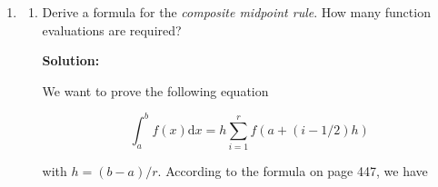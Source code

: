 \documentclass[12pt]{article}
\newcommand{\abs}[1]{\left| #1 \right|}
\begin{document}
\begin{enumerate}
\begin{enumerate}
\begin{align*}
E(f) = \frac{f^{(4)}(\eta)}{4!} \cdot \frac{4(b-a)^{5}}{5!} = \frac{f^{(4)}(\eta)(a - b)^{5}}{720}
\end{align*}

\item Use the basic corrected trapezoidal rule to evaluate approximations for $\int_{0}^{1}e^{x}\text{d}x$ and $\int_{0.9}^{1}e^{x}\text{d}x$. Compare errors to those of Example 15.2. What are your observations?

{\bf Solution:}

\begin{align*}
I_{f} &= \frac{b-a}{2}(f(a) + f(b)) + \frac{(b-a)^{2}}{12}(f^{\prime}(a) - f^{\prime}(b))
\intertext{For $a=0$ and $b=1$}
I_{f} &= \frac{1}{2}(1 + e) + \frac{1}{12}(1-e) = 1.7160\\
\intertext{For $a = 0.9$ and $b = 1$}
I_{f} &= \frac{1}{2}\left( e^{0.9} + e\right) + \frac{1}{12}\left( e^{0.9} - e\right) = 2.5674
\intertext{According to Example 15.2, the actual value is given, so we can find the error by the corrected trapezoidal rule, for $a = 0$ and $b = 1$}
E(f) &= \abs{1.7183 - 1.7160} = 0.0023\\
\intertext{for $a = 0.9$ and $b = 1$}
E(f) &= \abs{1.7183 - 2.5674} = 0.8491
\end{align*}

In $[0,1]$, the corrected trapezoidal rule is more accurate than the regular trapezoidal rule and the midpoint rule, though it still underperforms when compared to Simpson's rule ($\xi = 0.0006$). However, in $[0.9, 1]$ all of the methods are more accurate than the corrected trapezoidal rule.

\end{enumerate}

\item 

\begin{enumerate}
\item Derive a formula for the {\em composite midpoint rule}. How many function evaluations are required?

{\bf Solution:}

We want to prove the following equation

\[
\int_{a}^{b}f(x)\text{d}x = h\sum_{i=1}^{r}f\left( a + (i - 1/2)h\right)
\]

with $h = (b-a)/r$. According to the formula on page 447, we have


\end{enumerate}
\end{enumerate}
\end{document}
